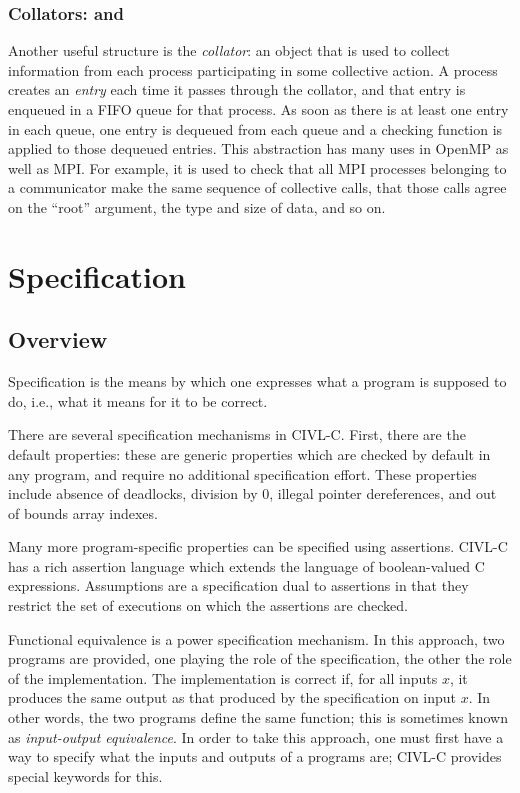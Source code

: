 \subsection{Collators: \cgcollator{} and \ccollator}
\label{sec:collators}
Another useful structure is the \emph{collator}: an object that is
used to collect information from each process participating in some
collective action.  A process creates an \emph{entry} each time it
passes through the collator, and that entry is enqueued in a FIFO
queue for that process.  As soon as there is at least one entry in
each queue, one entry is dequeued from each queue and a checking
function is applied to those dequeued entries.  This abstraction has
many uses in OpenMP as well as MPI.  For example, it is used to check
that all MPI processes belonging to a communicator make the same
sequence of collective calls, that those calls agree on the ``root''
argument, the type and size of data, and so on.


\chapter{Specification}

\section{Overview}

Specification is the means by which one expresses what a program is
supposed to do, i.e., what it means for it to be correct.

There are several specification mechanisms in CIVL-C. First, there are
the default properties: these are generic properties which are checked
by default in any program, and require no additional specification
effort. These properties include absence of deadlocks, division by 0,
illegal pointer dereferences, and out of bounds array indexes.

Many more program-specific properties can be specified using
assertions. CIVL-C has a rich assertion language which extends the
language of boolean-valued C expressions. Assumptions are a
specification dual to assertions in that they restrict the set
of executions on which the assertions are checked.

Functional equivalence is a power specification mechanism. In this
approach, two programs are provided, one playing the role of the
specification, the other the role of the implementation. The
implementation is correct if, for all inputs $x$, it produces the same
output as that produced by the specification on input $x$. In other
words, the two programs define the same function; this is sometimes
known as \emph{input-output equivalence}. In order to take this
approach, one must first have a way to specify what the inputs and
outputs of a programs are; CIVL-C provides special keywords for this.

